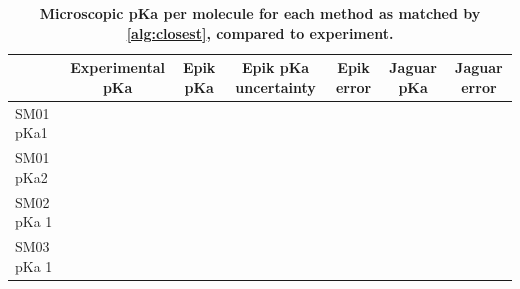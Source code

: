 \documentclass[9pt,lineno,final]{elife}
\begin{document}
\begin{table}[H]
	\centering
	\caption{{\bf Microscopic pKa per molecule for each method as matched by \cref{alg:closest}, compared to experiment.}}
	\label{tab:molecule-macro}
	\begin{tabular}{l|llllll}
		           & \multicolumn{1}{c}{Experimental pKa} & \multicolumn{1}{c}{Epik pKa} & \multicolumn{1}{c}{Epik pKa uncertainty} & \multicolumn{1}{c}{Epik error} & \multicolumn{1}{c}{Jaguar pKa} & \multicolumn{1}{c}{Jaguar error} \\ \hline
		SM01 pKa1  &                                      &                              &                                          &                                &                                &                                  \\
		SM01 pKa2  &                                      &                              &                                          &                                &                                &                                  \\
		SM02 pKa 1 &                                      &                              &                                          &                                &                                &                                  \\
		SM03 pKa 1 &                                      &                              &                                          &                                &                                &                                  
	\end{tabular}
\end{table}
    
\end{document}
